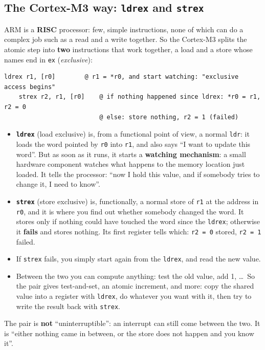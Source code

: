 \subsection{The Cortex-M3 way: \texttt{ldrex} and \texttt{strex}}
ARM is a \textbf{RISC} processor: few, simple instructions, none of which can do a complex job such as a read and a write together. So the Cortex-M3 splits the atomic step into \textbf{two} instructions that work together, a load and a store whose names end in \texttt{ex} (\emph{exclusive}):
\begin{lstlisting}[basicstyle=\ttfamily\footnotesize]
    ldrex r1, [r0]        @ r1 = *r0, and start watching: "exclusive access begins"
    strex r2, r1, [r0]    @ if nothing happened since ldrex: *r0 = r1, r2 = 0
                          @ else: store nothing, r2 = 1 (failed)
\end{lstlisting}
\begin{itemize}
    \item \textbf{\texttt{ldrex}} (load exclusive) is, from a functional point of view, a normal \texttt{ldr}: it loads the word pointed by \texttt{r0} into \texttt{r1}, and also says ``I want to update this word''. But as soon as it runs, it starts a \textbf{watching mechanism}: a small hardware component watches what happens to the memory location just loaded. It tells the processor: ``now I hold this value, and if somebody tries to change it, I need to know''.
    \item \textbf{\texttt{strex}} (store exclusive) is, functionally, a normal store of \texttt{r1} at the address in \texttt{r0}, and it is where you find out whether somebody changed the word. It stores only if nothing could have touched the word since the \texttt{ldrex}; otherwise it \textbf{fails} and stores nothing. Its first register tells which: \texttt{r2 = 0} stored, \texttt{r2 = 1} failed.
    \item If \texttt{strex} fails, you simply start again from the \texttt{ldrex}, and read the new value.
    \item Between the two you can compute anything: test the old value, add 1, \dots\ So the pair gives test-and-set, an atomic increment, and more: copy the shared value into a register with \texttt{ldrex}, do whatever you want with it, then try to write the result back with \texttt{strex}.
\end{itemize}
The pair is \textbf{not} ``uninterruptible'': an interrupt can still come between the two. It is ``either nothing came in between, or the store does not happen and you know it''.

